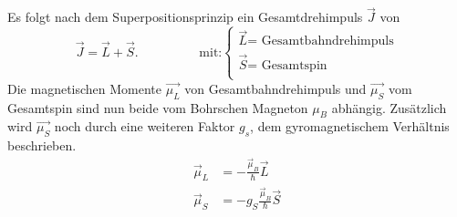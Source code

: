Es folgt nach dem Superpositionsprinzip ein Gesamtdrehimpuls $\vec{J}$ von 
\begin{equation*}
    \vec{J} = \vec{L} +\vec{S}. \hspace{2cm}\text{mit:}
    \begin{cases}
        \vec{L}\text{= Gesamtbahndrehimpuls}\\
        \vec{S}\text{= Gesamtspin}\\
    \end{cases}
\end{equation*}
Die magnetischen Momente $\vec{\mu_L}$ von Gesamtbahndrehimpuls und $\vec{\mu_S}$ vom Gesamtspin sind nun beide vom Bohrschen Magneton $\mu_B$ abhängig.
Zusätzlich wird $\vec{\mu_S}$ noch durch eine weiteren Faktor $g_s$, dem gyromagnetischem Verhältnis beschrieben.
\begin{align}
    \vec{\mu}_L &= - \frac{\vec{\mu}_B}{\hbar}\vec{L} \\
    \vec{\mu}_S &= -g_S \frac{\vec{\mu}_B}{\hbar}\vec{S} 
\end{align}
